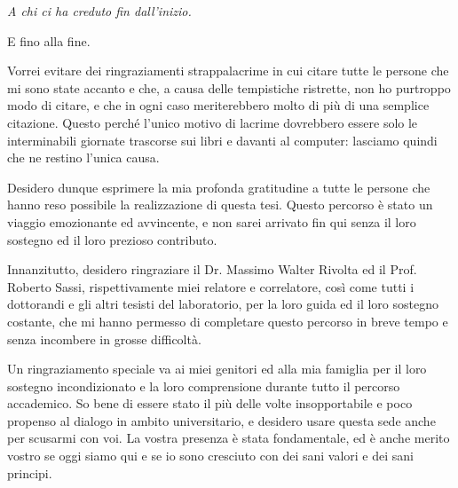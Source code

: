 \documentclass[12pt,italian]{report}
\newcommand\blankpage{%
    \null
    \thispagestyle{empty}%
    \addtocounter{page}{-1}%
    \newpage}
\begin{document}
%
%

\afterpage{\blankpage}
\frontespizio
\afterpage{\blankpage}
\beforepreface

% 
%

{\raggedleft \large \sl A chi ci ha creduto fin dall'inizio. \\
	
	\bigskip
	
	E fino alla fine. \\}
	
	
	
	Vorrei evitare dei ringraziamenti strappalacrime in cui citare tutte le persone
	che mi sono state accanto e che, a causa delle tempistiche ristrette, non ho purtroppo modo di citare, e che in ogni caso meriterebbero molto di più di una semplice citazione. Questo perché l’unico motivo di lacrime dovrebbero essere solo le interminabili giornate trascorse sui libri e davanti al computer: lasciamo quindi che ne restino l'unica causa.
	
	Desidero dunque esprimere la mia profonda gratitudine a tutte le persone che hanno reso possibile la realizzazione di questa tesi. Questo percorso è stato un viaggio emozionante ed avvincente, e non sarei arrivato fin qui senza il loro sostegno ed il loro prezioso contributo.
	
	Innanzitutto, desidero ringraziare il Dr. Massimo Walter Rivolta ed il Prof. Roberto Sassi, rispettivamente miei relatore e correlatore, così come tutti i dottorandi e gli altri tesisti del laboratorio, per la loro guida ed il loro sostegno costante, che mi hanno permesso di completare questo percorso in breve tempo e senza incombere in grosse difficoltà.
	
	Un ringraziamento speciale va ai miei genitori ed alla mia famiglia per il loro sostegno incondizionato e la loro comprensione durante tutto il percorso accademico. So bene di essere stato il più delle volte insopportabile e poco propenso al dialogo in ambito universitario, e desidero usare questa sede anche per scusarmi con voi. La vostra presenza è stata fondamentale, ed è anche merito vostro se oggi siamo qui e se io sono cresciuto con dei sani valori e dei sani principi.
	
\end{document}
